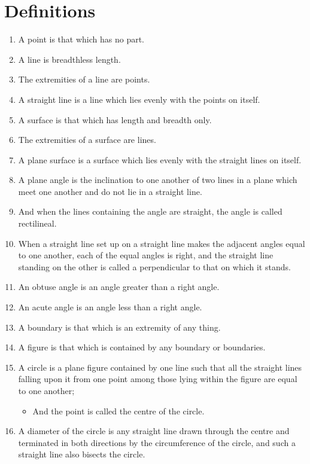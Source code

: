 
\section{Definitions}

\begin{enumerate}

\item A point is that which has no part.
\item A line is breadthless length.
\item The extremities of a line are points.
\item A straight line is a line which lies evenly with the
points on itself.
\item A surface is that which has length and breadth only.
\item The extremities of a surface are lines.
\item A plane surface is a surface which lies evenly with
the straight lines on itself.
\item A plane angle is the inclination to one another of
two lines in a plane which meet one another and do not lie in a straight line.
\item And when the lines containing the angle are straight, the angle is called rectilineal.
\item When a straight line set up on a straight line makes the adjacent angles equal to one another, each of the equal angles is right, and the straight line standing on the other is called a perpendicular to that on which it stands.
\item An obtuse angle is an angle greater than a right angle.
\item An acute angle is an angle less than a right angle.
\item A boundary is that which is an extremity of any­
thing.
\item A figure is that which is contained by any boundary or boundaries.
\item A circle is a plane figure contained by one line such that all the straight lines falling upon it from one point among those lying within the figure are equal to one another;
\begin{itemize}
\item And the point is called the centre of the circle.
\end{itemize}
\item A diameter of the circle is any straight line drawn through the centre and terminated in both directions by the circumference of the circle, and such a straight line also bisects the circle.

\end{enumerate}

